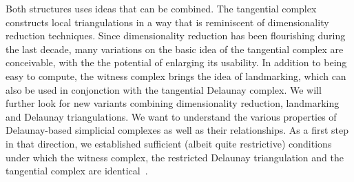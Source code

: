  Both structures uses ideas that can be combined. The tangential complex constructs local triangulations in a way that is reminiscent of dimensionality reduction techniques. Since dimensionality reduction has been flourishing during the last decade, many variations on the basic idea of the tangential complex are conceivable, with the the potential of enlarging its usability. In addition to being easy to compute, the witness complex brings the idea of landmarking, which can also be used in conjonction with the tangential Delaunay complex. We will further look for new
variants combining dimensionality reduction, landmarking and Delaunay triangulations. 
%
We want to understand the various properties of Delaunay-based simplicial complexes as well as their relationships. As a  first step in that direction, we established sufficient (albeit quite restrictive) conditions under which the witness complex, the restricted Delaunay triangulation and the tangential complex are identical~\cite{boissonnat2012stab}.





